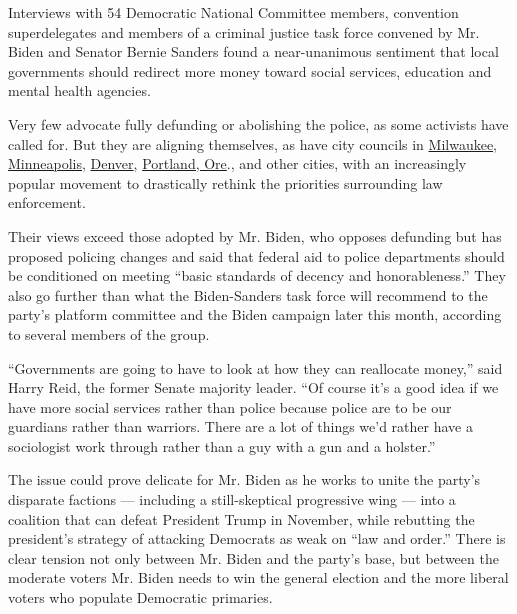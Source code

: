 Interviews with 54 Democratic National Committee members, convention
superdelegates and members of a criminal justice task force convened by
Mr. Biden and Senator Bernie Sanders found a near-unanimous sentiment
that local governments should redirect more money toward social
services, education and mental health agencies.

Very few advocate fully defunding or abolishing the police, as some
activists have called for. But they are aligning themselves, as have
city councils in
\href{https://www.jsonline.com/story/news/local/milwaukee/2020/06/15/defunding-police-milwaukee-alderman-seek-model-10-budget-cut/3192133001/}{Milwaukee},
\href{https://www.nytimes.com/2020/06/07/us/minneapolis-police-abolish.html}{Minneapolis},
\href{https://kdvr.com/news/local/new-denver-program-has-clinician-paramedic-respond-to-some-mental-health-911-calls-instead-of-police/}{Denver},
\href{https://www.kgw.com/article/news/local/portland-poised-to-shift-millions-from-police-bureau-to-street-response-team/283-2535b1dc-115a-4e4d-9e3a-48d2bcaf92be}{Portland,
Ore}., and other cities, with an increasingly popular movement to
drastically rethink the priorities surrounding law enforcement.

Their views exceed those adopted by Mr. Biden, who opposes defunding but
has proposed policing changes and said that federal aid to police
departments should be conditioned on meeting ``basic standards of
decency and honorableness.'' They also go further than what the
Biden-Sanders task force will recommend to the party's platform
committee and the Biden campaign later this month, according to several
members of the group.

``Governments are going to have to look at how they can reallocate
money,'' said Harry Reid, the former Senate majority leader. ``Of course
it's a good idea if we have more social services rather than police
because police are to be our guardians rather than warriors. There are a
lot of things we'd rather have a sociologist work through rather than a
guy with a gun and a holster.''

The issue could prove delicate for Mr. Biden as he works to unite the
party's disparate factions --- including a still-skeptical progressive
wing --- into a coalition that can defeat President Trump in November,
while rebutting the president's strategy of attacking Democrats as weak
on ``law and order.'' There is clear tension not only between Mr. Biden
and the party's base, but between the moderate voters Mr. Biden needs to
win the general election and the more liberal voters who populate
Democratic primaries.

